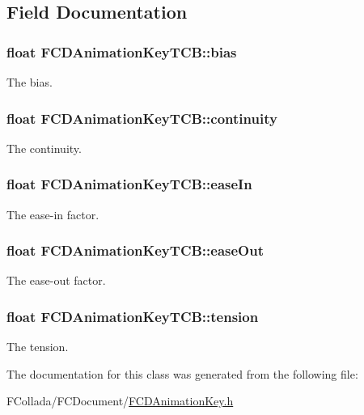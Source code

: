\subsection{Field Documentation}
\hypertarget{classFCDAnimationKeyTCB_a1676e8d6fded46456f042f9fb20e7c1d}{
\subsubsection[{bias}]{\setlength{\rightskip}{0pt plus 5cm}float {\bf FCDAnimationKeyTCB::bias}}}
\label{classFCDAnimationKeyTCB_a1676e8d6fded46456f042f9fb20e7c1d}
The bias. \hypertarget{classFCDAnimationKeyTCB_ac82f078ec71eed7e6ed88dad95e2ad45}{
\subsubsection[{continuity}]{\setlength{\rightskip}{0pt plus 5cm}float {\bf FCDAnimationKeyTCB::continuity}}}
\label{classFCDAnimationKeyTCB_ac82f078ec71eed7e6ed88dad95e2ad45}
The continuity. \hypertarget{classFCDAnimationKeyTCB_a256d60dd1899471eae3a633734e7edaa}{
\subsubsection[{easeIn}]{\setlength{\rightskip}{0pt plus 5cm}float {\bf FCDAnimationKeyTCB::easeIn}}}
\label{classFCDAnimationKeyTCB_a256d60dd1899471eae3a633734e7edaa}
The ease-\/in factor. \hypertarget{classFCDAnimationKeyTCB_a45cdf0eff558ae6b5721a65d072e452f}{
\subsubsection[{easeOut}]{\setlength{\rightskip}{0pt plus 5cm}float {\bf FCDAnimationKeyTCB::easeOut}}}
\label{classFCDAnimationKeyTCB_a45cdf0eff558ae6b5721a65d072e452f}
The ease-\/out factor. \hypertarget{classFCDAnimationKeyTCB_ab1f6045357667b2adff959bb737925f1}{
\subsubsection[{tension}]{\setlength{\rightskip}{0pt plus 5cm}float {\bf FCDAnimationKeyTCB::tension}}}
\label{classFCDAnimationKeyTCB_ab1f6045357667b2adff959bb737925f1}
The tension. 

The documentation for this class was generated from the following file:\begin{DoxyCompactItemize}
\item 
FCollada/FCDocument/\hyperlink{FCDAnimationKey_8h}{FCDAnimationKey.h}\end{DoxyCompactItemize}
